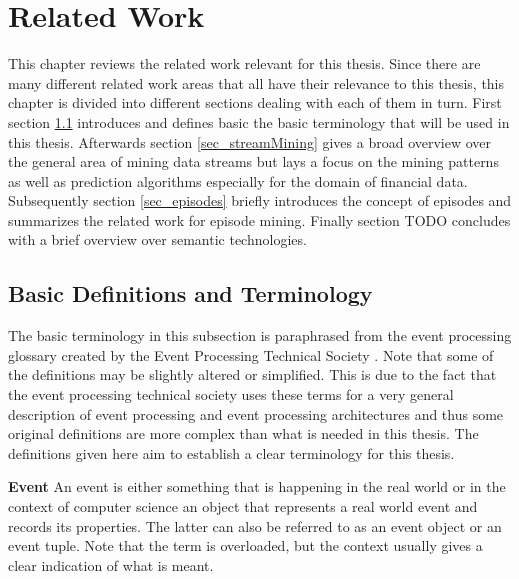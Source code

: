 
\chapter{Related Work}
\label{chapter_related}

\ifpdf
    \graphicspath{{Chapter2/Figs/Raster/}{Chapter2/Figs/PDF/}{Chapter2/Figs/}}
\else
    \graphicspath{{Chapter2/Figs/Vector/}{Chapter2/Figs/}}
\fi

This chapter reviews the related work relevant for this thesis. Since there are many different related work areas that all have their relevance to this thesis, this chapter is divided into different sections dealing with each of them in turn. First section \ref{sec_basicDefinitions} introduces and defines basic the basic terminology that will be used in this thesis. Afterwards section \ref{sec_streamMining} gives a broad overview over the general area of mining data streams but lays a focus on the mining patterns as well as prediction algorithms especially for the domain of financial data. Subsequently section \ref{sec_episodes} briefly introduces the concept of episodes and summarizes the related work for episode mining. Finally section TODO concludes with a brief overview over semantic technologies.

\section{Basic Definitions and Terminology}
\label{sec_basicDefinitions}
The basic terminology in this subsection is paraphrased from the event processing glossary created by the Event Processing Technical Society \cite{luckham2011epts}. Note that some of the definitions may be slightly altered or simplified. This is due to the fact that the event processing technical society uses these terms for a very general description of event processing and event processing architectures and thus some original definitions are more complex than what is needed in this thesis. The definitions given here aim to establish a clear terminology for this thesis.

\begin{mydef}
\textbf{Event} An event is either something that is happening in the real world or in the context of computer science an object that represents a real world event and records its properties. The latter can also be referred to as an event object or an event tuple. Note that the term is overloaded, but the context usually gives a clear indication of what is meant.
\end{mydef}

